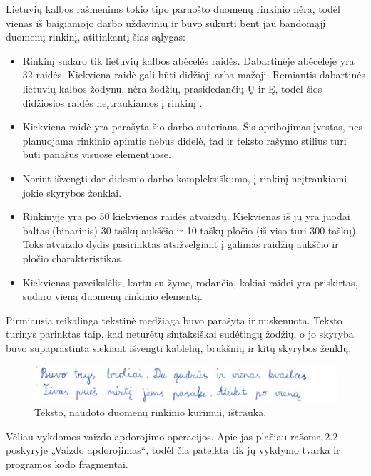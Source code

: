 \documentclass[a4paper,12pt]{article}
\begin{document}
Lietuvių kalbos rašmenims tokio tipo paruošto duomenų rinkinio nėra, todėl vienas iš baigiamojo darbo uždavinių ir buvo sukurti bent jau bandomąjį duomenų rinkinį, atitinkantį šias sąlygas:
\begin{itemize}
	\item Rinkinį sudaro tik lietuvių kalbos abėcėlės raidės. Dabartinėje abėcėlėje yra 32 raidės. Kiekviena raidė gali būti didžioji arba mažoji. Remiantis dabartinės lietuvių kalbos žodynu, nėra žodžių, prasidedančių Ų ir Ę, todėl šios didžiosios raidės neįtraukiamos į rinkinį \cite{DLKZ}.
	\item Kiekviena raidė yra parašyta šio darbo autoriaus. Šis apribojimas įvestas, nes planuojama rinkinio apimtis nebus didelė, tad ir teksto rašymo stilius turi būti panašus visuose elementuose.
	\item Norint išvengti dar didesnio darbo kompleksiškumo, į rinkinį neįtraukiami jokie skyrybos ženklai.
	\item Rinkinyje yra po 50 kiekvienos raidės atvaizdų. Kiekvienas iš jų yra juodai baltas (binarinis) 30 taškų aukščio ir 10 taškų pločio (iš viso turi 300 taškų). Toks atvaizdo dydis pasirinktas atsižvelgiant į galimas raidžių aukščio ir pločio charakteristikas.
	\item Kiekvienas paveikslėlis, kartu su žyme, rodančia, kokiai raidei yra priskirtas, sudaro vieną duomenų rinkinio elementą.  
\end{itemize}

Pirmiausia reikalinga tekstinė medžiaga buvo parašyta ir nuskenuota. Teksto turinys parinktas taip, kad neturėtų sintaksiškai sudėtingų žodžių, o jo skyryba buvo supaprastinta siekiant išvengti kablelių, brūkšnių ir kitų skyrybos ženklų.

		\begin{figure}[H]
			\centering
			\includegraphics[scale=0.3]{images/scanned}
			\caption{Teksto, naudoto duomenų rinkinio kūrimui, ištrauka.}   %
			\label{img:scanned}
		\end{figure}

Vėliau vykdomos vaizdo apdorojimo operacijos. Apie jas plačiau rašoma 2.2 poskyryje „Vaizdo apdorojimas“, todėl čia pateikta tik jų vykdymo tvarka ir programos kodo fragmentai.
\end{document}

